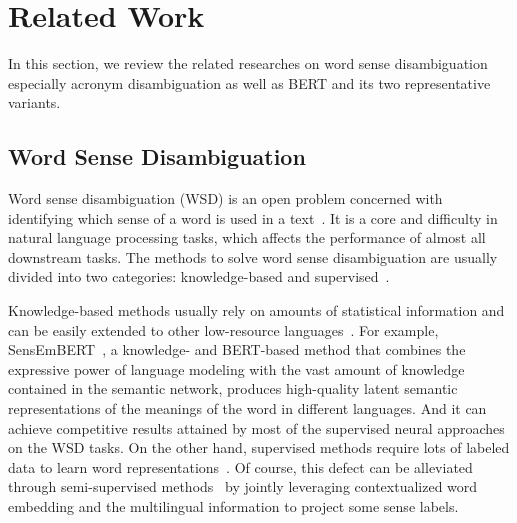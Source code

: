 \section{Related Work}
\label{sec:relatedwork}
In this section, we review the related researches on word sense disambiguation especially acronym disambiguation as well as BERT and its two representative variants.

\subsection{Word Sense Disambiguation}
Word sense disambiguation (WSD) is an open problem concerned with identifying which sense of a word is used in a text~\cite{navigli2009word}.
It is a core and difficulty in natural language processing tasks, which affects the performance of almost all downstream tasks.
The methods to solve word sense disambiguation are usually divided into two categories: knowledge-based and supervised~\cite{wang2020word,barba2020mulan}.

Knowledge-based methods usually rely on amounts of statistical information and can be easily extended to other low-resource languages~\cite{agirre2014random,scarlini2020sensembert}.
For example, SensEmBERT~\citep{scarlini2020sensembert}, a knowledge- and BERT-based method that combines the expressive power of language modeling with the vast amount of knowledge contained in the semantic network, produces high-quality latent semantic representations of the meanings of the word in different languages.
And it can achieve competitive results attained by most of the supervised neural approaches on the WSD tasks.
On the other hand, supervised methods require lots of labeled data to learn word representations~\cite{bevilacqua2020breaking,wang2020word}.
Of course, this defect can be alleviated through semi-supervised methods~\cite{barba2020mulan} by jointly leveraging contextualized word embedding and the multilingual information to project some sense labels.

